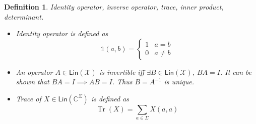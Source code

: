 \documentclass[aps,pra,onecolumn,notitlepage,superscriptaddress]{revtex4-1}
\newcommand{\C}{\mathbb{C}}
\newcommand{\spc}[1]{\mathcal{#1}}
\newcommand{\Lin}{\mathsf{Lin}}
\newcommand{\Tr}{\operatorname{Tr}}
\newcommand\I{\mathds{1}}
\newtheorem{defi}{Definition}
\begin{document}
    \begin{defi}
        Identity operator, inverse operator, trace, inner product, determinant.
        \begin{itemize}
            \item Identity operator is defined as
            \begin{equation}
                \I(a,b) = \begin{cases}
                    1 & a = b \\
                    0 & a \neq b
                \end{cases}
            \end{equation}

            \item An operator $A \in \Lin(\spc X)$ is invertible iff $\exists B \in \Lin(\spc X),\ BA = I$. It can be shown that $BA=I \implies AB=I$. Thus $B = A^{-1}$ is unique.
            
            \item Trace of $X \in \Lin(\C^{\Sigma})$ is defined as
            \begin{equation}
                \Tr(X) = \sum_{a \in \Sigma}X(a,a)
            \end{equation}


\end{itemize}
\end{defi}
\end{document}
